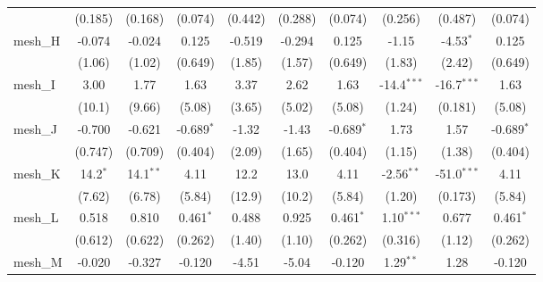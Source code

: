 \begin{tabular}{lccccccccc}
                                                               & (0.185)     & (0.168)       & (0.074)       & (0.442)  & (0.288)    & (0.074)       & (0.256)       & (0.487)       & (0.074)\\   
   mesh\_H                                                     & -0.074      & -0.024        & 0.125         & -0.519   & -0.294     & 0.125         & -1.15         & -4.53$^{*}$   & 0.125\\   
                                                               & (1.06)      & (1.02)        & (0.649)       & (1.85)   & (1.57)     & (0.649)       & (1.83)        & (2.42)        & (0.649)\\   
   mesh\_I                                                     & 3.00        & 1.77          & 1.63          & 3.37     & 2.62       & 1.63          & -14.4$^{***}$ & -16.7$^{***}$ & 1.63\\   
                                                               & (10.1)      & (9.66)        & (5.08)        & (3.65)   & (5.02)     & (5.08)        & (1.24)        & (0.181)       & (5.08)\\   
   mesh\_J                                                     & -0.700      & -0.621        & -0.689$^{*}$  & -1.32    & -1.43      & -0.689$^{*}$  & 1.73          & 1.57          & -0.689$^{*}$\\   
                                                               & (0.747)     & (0.709)       & (0.404)       & (2.09)   & (1.65)     & (0.404)       & (1.15)        & (1.38)        & (0.404)\\   
   mesh\_K                                                     & 14.2$^{*}$  & 14.1$^{**}$   & 4.11          & 12.2     & 13.0       & 4.11          & -2.56$^{**}$  & -51.0$^{***}$ & 4.11\\   
                                                               & (7.62)      & (6.78)        & (5.84)        & (12.9)   & (10.2)     & (5.84)        & (1.20)        & (0.173)       & (5.84)\\   
   mesh\_L                                                     & 0.518       & 0.810         & 0.461$^{*}$   & 0.488    & 0.925      & 0.461$^{*}$   & 1.10$^{***}$  & 0.677         & 0.461$^{*}$\\   
                                                               & (0.612)     & (0.622)       & (0.262)       & (1.40)   & (1.10)     & (0.262)       & (0.316)       & (1.12)        & (0.262)\\   
   mesh\_M                                                     & -0.020      & -0.327        & -0.120        & -4.51    & -5.04      & -0.120        & 1.29$^{**}$   & 1.28          & -0.120\\   

\end{tabular}
